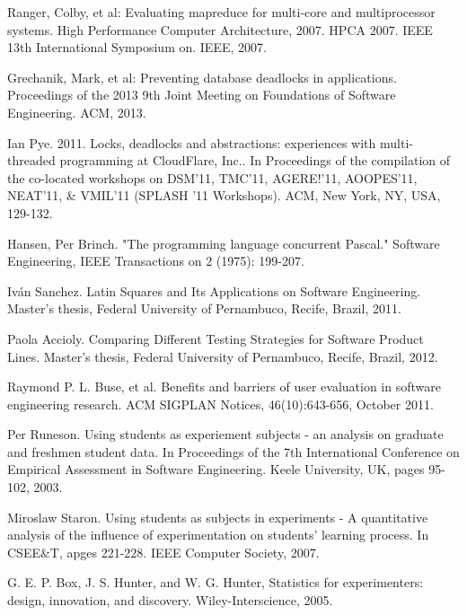 \begin{thebibliography}{4}
 Ranger, Colby, et al: Evaluating mapreduce for multi-core and multiprocessor systems.
High Performance Computer Architecture, 2007. HPCA 2007. IEEE 13th International Symposium on. IEEE, 2007.

 Grechanik, Mark, et al: Preventing database deadlocks in applications.
Proceedings of the 2013 9th Joint Meeting on Foundations of Software Engineering. ACM, 2013.

 Ian Pye. 2011. Locks, deadlocks and abstractions: experiences with multi-threaded programming at CloudFlare, Inc.. In Proceedings of the compilation of the co-located workshops on DSM'11, TMC'11, AGERE!'11, AOOPES'11, NEAT'11, & VMIL'11 (SPLASH '11 Workshops). ACM, New York, NY, USA, 129-132.

 Hansen, Per Brinch. "The programming language concurrent Pascal." Software Engineering, IEEE Transactions on 2 (1975): 199-207.

 Iván Sanchez. Latin Squares and Its Applications on Software Engineering. Master's thesis, Federal University of Pernambuco, Recife, Brazil, 2011.

 Paola Accioly. Comparing Different Testing Strategies for Software Product Lines. Master's thesis, Federal University of Pernambuco, Recife, Brazil, 2012.

 Raymond P. L. Buse, et al. Benefits and barriers of user evaluation in software engineering research. ACM SIGPLAN Notices, 46(10):643-656, October 2011.

 Per Runeson. Using students as experiement subjects - an analysis on graduate and freshmen student data. In Proceedings of the 7th International Conference on Empirical Assessment in Software Engineering. Keele University, UK, pages 95-102, 2003.

 Miroslaw Staron. Using students as subjects in experiments - A quantitative analysis of the influence of experimentation on students' learning process. In CSEE&T, apges 221-228. IEEE Computer Society, 2007.

 G. E. P. Box, J. S. Hunter, and W. G. Hunter, Statistics for experimenters: design, innovation, and discovery. Wiley-Interscience, 2005.

\end{thebibliography}
